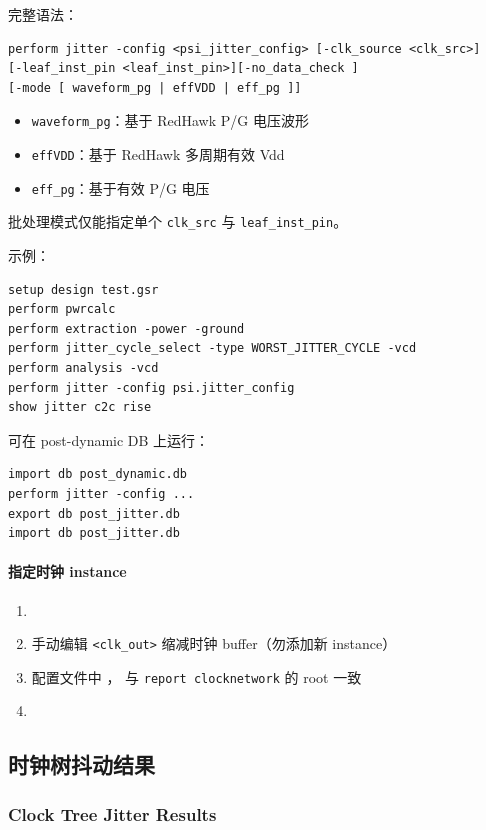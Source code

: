 完整语法：
\begin{lstlisting}
perform jitter -config <psi_jitter_config> [-clk_source <clk_src>]
[-leaf_inst_pin <leaf_inst_pin>][-no_data_check ]
[-mode [ waveform_pg | effVDD | eff_pg ]]
\end{lstlisting}
\begin{itemize}
  \item \texttt{waveform\_pg}：基于 RedHawk P/G 电压波形
  \item \texttt{effVDD}：基于 RedHawk 多周期有效 Vdd
  \item \texttt{eff\_pg}：基于有效 P/G 电压
\end{itemize}

批处理模式仅能指定单个 \texttt{clk\_src} 与 \texttt{leaf\_inst\_pin}。

示例：
\begin{lstlisting}
setup design test.gsr
perform pwrcalc
perform extraction -power -ground
perform jitter_cycle_select -type WORST_JITTER_CYCLE -vcd
perform analysis -vcd
perform jitter -config psi.jitter_config
show jitter c2c rise
\end{lstlisting}

可在 post-dynamic DB 上运行：
\begin{lstlisting}
import db post_dynamic.db
perform jitter -config ...
export db post_jitter.db
import db post_jitter.db
\end{lstlisting}

\paragraph{指定时钟 instance}
\begin{enumerate}
  \item {}
  \item 手动编辑 \texttt{<clk\_out>} 缩减时钟 buffer（勿添加新 instance）
  \item 配置文件中 ， 与 \texttt{report clocknetwork} 的 root 一致
  \item {}
\end{enumerate}

\subsection{时钟树抖动结果}
\subsubsection*{Clock Tree Jitter Results}

